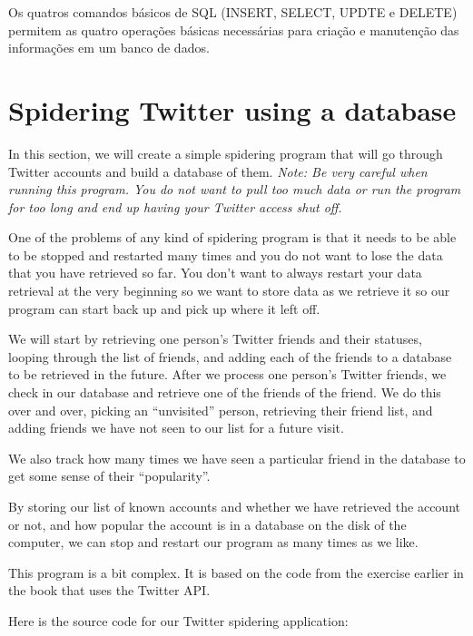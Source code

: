 Os quatros comandos básicos de SQL (INSERT, SELECT, UPDTE e DELETE) permitem
as quatro operações básicas necessárias para criação e manutenção das
informações em um banco de dados.

\section{Spidering Twitter using a database}

In this section, we will create a simple spidering program that will 
go through Twitter accounts and build a database of them.
\emph{Note: Be very careful when running this program.  You do not
want to pull too much data or run the program for too long and
end up having your Twitter access shut off.}

One of the problems of any kind of spidering program is that it 
needs to be able to be stopped and restarted many times and 
you do not want to lose the data that you have retrieved so far.
You don't want to always restart your data retrieval at the
very beginning so we want to store data as we retrieve it so our
program can start back up and pick up where it left off.

We will start by retrieving one person's Twitter friends and their
statuses, looping through the list of friends, and adding each 
of the friends to a database to be retrieved in the future.  After
we process one person's Twitter friends, we check in our database
and retrieve one of the friends of the friend.  We do this over and
over, picking an ``unvisited'' person, retrieving their friend list,
and adding friends we have not seen to our list for a future visit.

We also track how many times we have seen a particular friend in the
database to get some sense of their ``popularity''.

By storing our list of known accounts and whether 
we have retrieved the account or not, 
and how popular the account is in a database on the disk
of the computer, we can stop and
restart our program as many times as we like.

This program is a bit complex. It is based on the code 
from the exercise earlier in the book that uses
the Twitter API.

Here is the source code for our Twitter spidering application:

